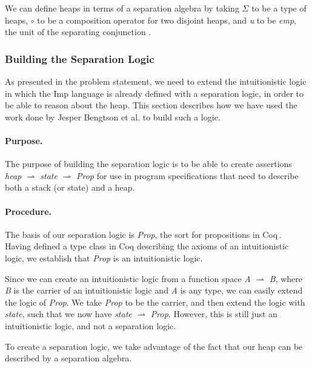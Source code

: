 We can define heaps in terms of a separation algebra by taking $\Sigma$ to be a type of heaps, $\circ$ to be a composition operator for two disjoint heaps, and {\it u} to be {\it emp}, the unit of the separating conjunction \cite{BirkedalL:veroop-conf}.

\subsubsection{Building the Separation Logic}
As presented in the problem statement, we need to extend the intuitionistic logic in which the Imp language is already defined with a separation logic, in order to be able to reason about the heap. This section describes how we have used the work done by Jesper Bengtson et al.  to build such a logic.

\paragraph{Purpose.}
The purpose of building the separation logic is to be able to create assertions {\it heap} $\rightharpoonup$ {\it state} $\rightharpoonup$ {\it Prop} for use in program specifications that need to describe both a stack (or state) and a heap.

\paragraph{Procedure.} The basis of our separation logic is {\it Prop}, the sort for propositions in Coq\,\cite{CoqIntro}. Having defined a type class in Coq describing the axioms of an intuitionistic logic, we establish that {\it Prop} is an intuitionistic logic.

Since we can create an intuitionistic logic from a function space {\it A} $\rightharpoonup$ {\it B}, where {\it B} is the carrier of an intuitionistic logic and {\it A} is any type, we can easily extend the logic of {\it Prop}. We take {\it Prop} to be the carrier, and then extend the logic with {\it state}, such that we now have {\it state} $\rightharpoonup$ {\it Prop}. However, this is still just an intuitionistic logic, and not a separation logic.

To create a separation logic, we take advantage of the fact that our heap can be described by a separation algebra. 

